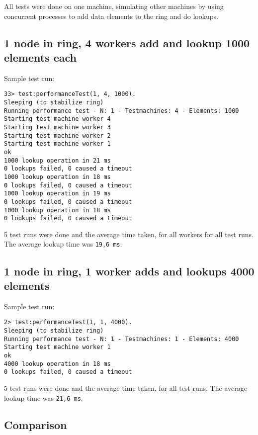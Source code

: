 \documentclass[a4paper, 11pt]{article}
\begin{document}
All tests were done on one machine, simulating other machines by using concurrent processes to add data elements to the ring and do lookups.

\subsection{1 node in ring, 4 workers add and lookup 1000 elements each}

Sample test run:

\begin{verbatim}
33> test:performanceTest(1, 4, 1000).
Sleeping (to stabilize ring)
Running performance test - N: 1 - Testmachines: 4 - Elements: 1000
Starting test machine worker 4
Starting test machine worker 3
Starting test machine worker 2
Starting test machine worker 1
ok
1000 lookup operation in 21 ms
0 lookups failed, 0 caused a timeout
1000 lookup operation in 18 ms
0 lookups failed, 0 caused a timeout
1000 lookup operation in 19 ms
0 lookups failed, 0 caused a timeout
1000 lookup operation in 18 ms
0 lookups failed, 0 caused a timeout
\end{verbatim}

5 test runs were done and the average time taken, for all workers for all test runs. The average lookup time was \texttt{19,6 ms}.

\subsection{1 node in ring, 1 worker adds and lookups 4000 elements}

Sample test run:

\begin{verbatim}
2> test:performanceTest(1, 1, 4000).
Sleeping (to stabilize ring)
Running performance test - N: 1 - Testmachines: 1 - Elements: 4000
Starting test machine worker 1
ok
4000 lookup operation in 18 ms
0 lookups failed, 0 caused a timeout
\end{verbatim}

5 test runs were done and the average time taken, for all test runs. The average lookup time was \texttt{21,6 ms}.

\subsection{Comparison}
\end{document}

